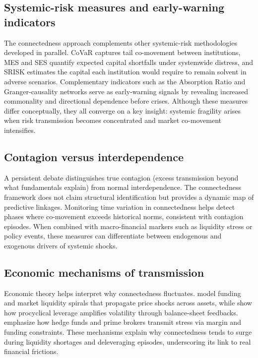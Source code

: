 \subsection{Systemic-risk measures and early-warning indicators}

The connectedness approach complements other systemic-risk methodologies developed in
parallel. CoVaR \citep{AdrianBrunnermeier2016} captures tail co-movement between
institutions, MES and SES \citep{Acharya2017} quantify expected capital shortfalls under
systemwide distress, and SRISK \citep{BrownleesEngle2017} estimates the capital each
institution would require to remain solvent in adverse scenarios. Complementary indicators
such as the Absorption Ratio \citep{KritzmanLiPageRigobon2011} and Granger-causality
networks \citep{BillioEtAl2012JFE} serve as early-warning signals by revealing increased
commonality and directional dependence before crises. Although these measures differ
conceptually, they all converge on a key insight: systemic fragility arises when risk
transmission becomes concentrated and market co-movement intensifies.

\subsection{Contagion versus interdependence}

A persistent debate distinguishes true contagion (excess transmission beyond what
fundamentals explain) from normal interdependence. The connectedness framework does not
claim structural identification but provides a dynamic map of predictive linkages.
Monitoring time variation in connectedness helps detect phases where co-movement exceeds
historical norms, consistent with contagion episodes. When combined with macro-financial
markers such as liquidity stress or policy events, these measures can differentiate
between endogenous and exogenous drivers of systemic shocks.

\subsection{Economic mechanisms of transmission}

Economic theory helps interpret why connectedness fluctuates.
\citet{BrunnermeierPedersen2009} model funding and market liquidity spirals that
propagate price shocks across assets, while \citet{DanielssonShinZigrand2012} show how
procyclical leverage amplifies volatility through balance-sheet feedbacks.
\citet{KingMaier2009} emphasize how hedge funds and prime brokers transmit stress via
margin and funding constraints. These mechanisms explain why connectedness tends to surge
during liquidity shortages and deleveraging episodes, underscoring its link to real
financial frictions.

